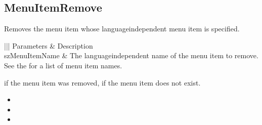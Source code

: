 \documentclass[letterpaper,12pt,english,openany,oneside]{sphinxmanual}
\begin{document}
\subsection{MenuItemRemove}
\label{\detokenize{IAC_API_OLE_Objects:menuitemremove}}
Removes the menu item whose language\sphinxhyphen{}independent menu item is specified.


\begin{sphinxVerbatim}[commandchars=\\\{\}]
  
\end{sphinxVerbatim}
\label{\detokenize{IAC_API_OLE_Objects:parameters-10}}


\begin{savenotes}\sphinxattablestart
\centering
{}\label{\detokenize{IAC_API_OLE_Objects:section-12}}\nobreak
\begin{tabular}[t]{|||}
\hline
\sphinxstyletheadfamily 
Parameters
&\sphinxstyletheadfamily 
Description
\\
\hline
szMenuItemName
&
The language\sphinxhyphen{}independent name of the menu item to remove. See the  for a list of menu item names.
\\
\hline
\end{tabular}
\par
\sphinxattableend\end{savenotes}


 if the menu item was removed,  if the menu item does not exist.

\label{\detokenize{IAC_API_OLE_Objects:related-methods-17}}
\begin{itemize}
\item {} 
 

\item {} 
 

\item {} 
 

\end{itemize}
\end{document}
